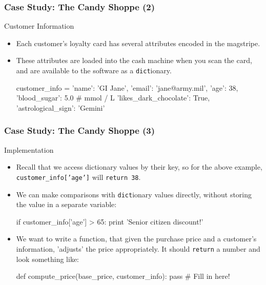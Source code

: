 \documentclass[10pt]{beamer}
\begin{document}
\begin{frame}[fragile]
  \frametitle{Case Study: The Candy Shoppe (2)}
  \begin{block}{Customer Information}
    \begin{itemize}
      \item Each customer's loyalty card has several attributes encoded in the magstripe.
      \item These attributes are loaded into the cash machine when you scan the card, and are available to the software as a \texttt{dict}ionary.
        \begin{pythoncode}
  customer_info = {
    'name': 'GI Jane',
    'email': 'jane@army.mil',
    'age': 38,
    'blood_sugar': 5.0 # mmol / L
    'likes_dark_chocolate': True,
    'astrological_sign': 'Gemini'
  }
        \end{pythoncode}
    \end{itemize}
  \end{block}
\end{frame}

\begin{frame}[fragile]
  \frametitle{Case Study: The Candy Shoppe (3)}
  \begin{block}{Implementation}
    \begin{itemize}
      \item Recall that we access dictionary values by their key, so for the above example, \texttt{customer\_info['age']} will \texttt{return 38}.
      \item We can make comparisons with \texttt{dict}ionary values directly, without storing the value in a separate variable:
        \begin{pythoncode}
  if customer_info['age'] > 65:
    print 'Senior citizen discount!'
        \end{pythoncode}
      \item We want to write a function, that given the purchase price and a customer's information, 'adjusts' the price appropriately.
        It should \texttt{return} a number and look something like:
        \begin{pythoncode}
  def compute_price(base_price, customer_info):
    pass # Fill in here!
        \end{pythoncode}
    \end{itemize}
  \end{block}
\end{frame}
\end{document}
